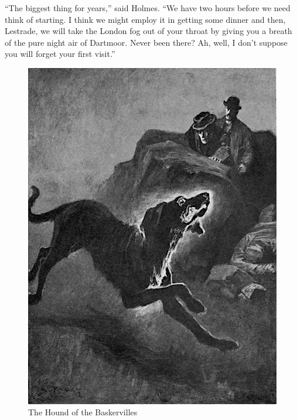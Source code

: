 \documentclass[paper=a5,BCOR=7mm,twoside,DIV=calc,12pt,usegeometry,openany,chapterprefix,endperiod,headings=big]{scrbook} %
\begin{document}
\enquote{The biggest thing for years,} said Holmes. \enquote{We have two hours before we need think of starting. I think we might employ it in getting some dinner and then, Lestrade, we will take the London fog out of your throat by giving you a breath of the pure night air of Dartmoor. Never been there? Ah, well, I don't suppose you will forget your first visit.}
\clearpage
\vfill
\begin{figure}[tbph]
\centering
\includegraphics[width=\linewidth]{14_thehound}
\caption{The Hound of the Baskervilles}
\end{figure}
\vfill
\thispagestyle{empty}
\clearpage
\end{document}
